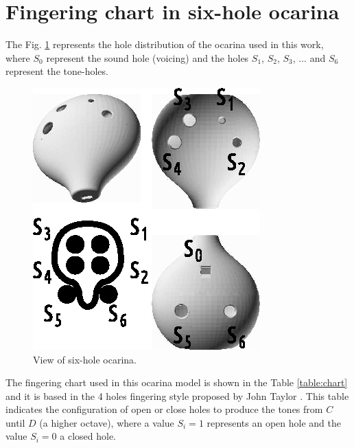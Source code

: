 \documentclass[11pt,twocolumn]{article}
\begin{document}
\section{Fingering chart in six-hole ocarina}
The Fig. \ref{fig:ocarinaview} represents the hole distribution of the ocarina
used in this work, where $S_0$ represent the sound hole (voicing)
and the holes $S_1$, $S_2$, $S_3$, ... and $S_6$ represent the tone-holes.
\begin{figure}[ht!]
\centering
\includegraphics[width=0.750\columnwidth]{ocarina-view.eps}
\caption{View of six-hole ocarina. }
\label{fig:ocarinaview}
\end{figure}
The fingering chart used in this ocarina model is shown in the Table \ref{table:chart} and it is based in the 
4 holes fingering style proposed by John Taylor \cite[pp. 79, 146]{metropolitan1985american}. 
This table indicates the configuration of open or close holes
to produce the tones from $C$ until $D$ (a higher octave), where a value $S_i=1$ represents an 
open hole and the value $S_i=0$ a closed hole.
\end{document}
